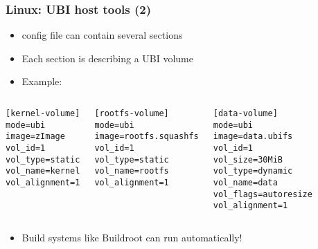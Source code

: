 \begin{frame}[fragile]
  \frametitle{Linux: UBI host tools (2)}
  \begin{itemize}
  \item {} config file can contain several sections
  \item Each section is describing a UBI volume
  \item Example:
  \end{itemize}
  \begin{columns}
\small
\begin{verbatim}
[kernel-volume]
mode=ubi
image=zImage
vol_id=1
vol_type=static
vol_name=kernel
vol_alignment=1
\end{verbatim}
\small
\begin{verbatim}
[rootfs-volume]
mode=ubi
image=rootfs.squashfs
vol_id=1
vol_type=static
vol_name=rootfs
vol_alignment=1
\end{verbatim}
\small
\begin{verbatim}
[data-volume]
mode=ubi
image=data.ubifs
vol_id=1
vol_size=30MiB
vol_type=dynamic
vol_name=data
vol_flags=autoresize
vol_alignment=1
\end{verbatim}
  \end{columns}
  \begin{itemize}
  \item Build systems like Buildroot can run  automatically!
  \end{itemize}
\end{frame}

